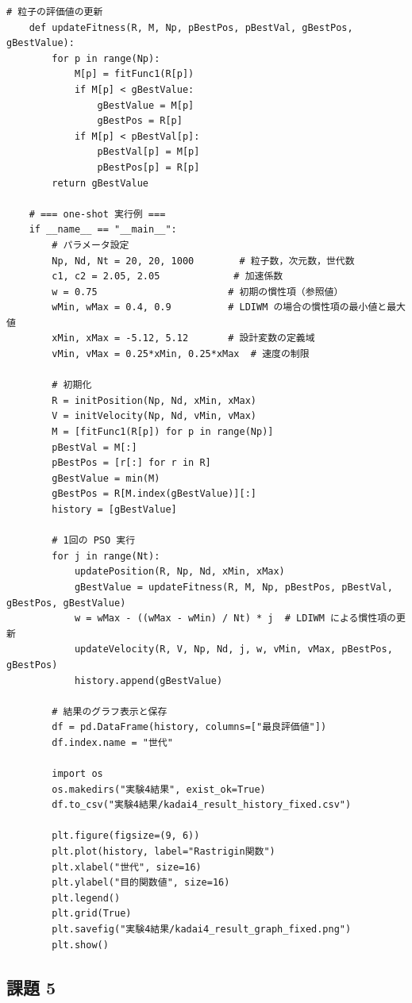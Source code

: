 \begin{lstlisting}[caption=LDIWM を用いた PSO実験コード, label=lst:kadai2_code]
    # 粒子の評価値の更新
    def updateFitness(R, M, Np, pBestPos, pBestVal, gBestPos, gBestValue):
        for p in range(Np):
            M[p] = fitFunc1(R[p])
            if M[p] < gBestValue:
                gBestValue = M[p]
                gBestPos = R[p]
            if M[p] < pBestVal[p]:
                pBestVal[p] = M[p]
                pBestPos[p] = R[p]
        return gBestValue
    
    # === one-shot 実行例 ===
    if __name__ == "__main__":
        # パラメータ設定
        Np, Nd, Nt = 20, 20, 1000        # 粒子数，次元数，世代数
        c1, c2 = 2.05, 2.05             # 加速係数
        w = 0.75                       # 初期の慣性項（参照値）
        wMin, wMax = 0.4, 0.9          # LDIWM の場合の慣性項の最小値と最大値
        xMin, xMax = -5.12, 5.12       # 設計変数の定義域
        vMin, vMax = 0.25*xMin, 0.25*xMax  # 速度の制限
    
        # 初期化
        R = initPosition(Np, Nd, xMin, xMax)
        V = initVelocity(Np, Nd, vMin, vMax)
        M = [fitFunc1(R[p]) for p in range(Np)]
        pBestVal = M[:]
        pBestPos = [r[:] for r in R]
        gBestValue = min(M)
        gBestPos = R[M.index(gBestValue)][:]
        history = [gBestValue]
    
        # 1回の PSO 実行
        for j in range(Nt):
            updatePosition(R, Np, Nd, xMin, xMax)
            gBestValue = updateFitness(R, M, Np, pBestPos, pBestVal, gBestPos, gBestValue)
            w = wMax - ((wMax - wMin) / Nt) * j  # LDIWM による慣性項の更新
            updateVelocity(R, V, Np, Nd, j, w, vMin, vMax, pBestPos, gBestPos)
            history.append(gBestValue)
    
        # 結果のグラフ表示と保存
        df = pd.DataFrame(history, columns=["最良評価値"])
        df.index.name = "世代"
        
        import os
        os.makedirs("実験4結果", exist_ok=True)
        df.to_csv("実験4結果/kadai4_result_history_fixed.csv")
        
        plt.figure(figsize=(9, 6))
        plt.plot(history, label="Rastrigin関数")
        plt.xlabel("世代", size=16)
        plt.ylabel("目的関数値", size=16)
        plt.legend()
        plt.grid(True)
        plt.savefig("実験4結果/kadai4_result_graph_fixed.png")
        plt.show()
\end{lstlisting}


\subsection{課題 5}

